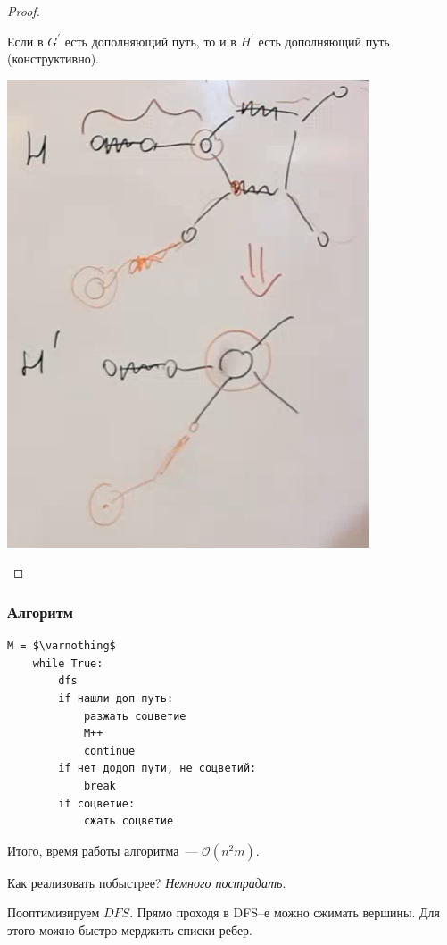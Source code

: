 \begin{proof}
\begin{enumerate}
        Если в $G^\prime$ есть дополняющий путь, то и в $H^\prime$ есть дополняющий путь (конструктивно).
        \begin{center}
            \includegraphics[scale=0.475]{img/parsoch_blossom_cut_proof_2}
        \end{center}
    \end{enumerate}
\end{proof}

\subsubsection*{Алгоритм}

\begin{lstlisting}[mathescape=true]
    M = $\varnothing$
    while True:
        dfs
        if нашли доп путь:
            разжать соцветие
            M++
            continue
        if нет додоп пути, не соцветий:
            break
        if соцветие:
            сжать соцветие
\end{lstlisting}

Итого, время работы алгоритма~--- $\mathcal{O}(n^2 m)$.

Как реализовать побыстрее? \textit{Немного пострадать}.

Пооптимизируем $DFS$.
Прямо проходя в DFS--е можно сжимать вершины.
Для этого можно быстро мерджить списки ребер.

